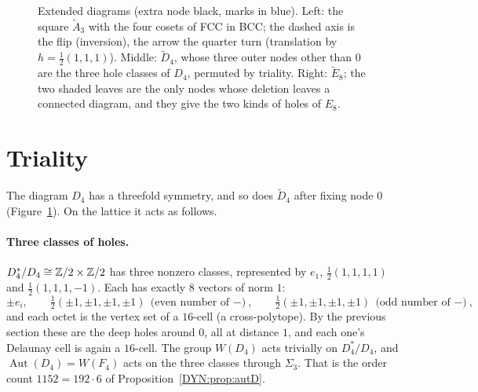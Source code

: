 \begin{figure}[ht]
\caption{Extended diagrams (extra node black, marks in blue). Left: the square $\tilde A_3$ with the four
cosets of FCC in BCC; the dashed axis is the flip (inversion), the arrow the quarter turn (translation by
$h=\frac12(1,1,1)$). Middle: $\tilde D_4$, whose three outer nodes other than $0$ are the three hole
classes of $D_4$, permuted by triality. Right: $\tilde E_8$; the two shaded leaves are the only nodes whose
deletion leaves a connected diagram, and they give the two kinds of holes of $E_8$.}
\label{DYN:fig:ext}
\end{figure}

\section{Triality}
\label{DYN:sec:triality}

The diagram $D_4$ has a threefold symmetry, and so does $\tilde D_4$ after fixing node $0$
(Figure~\ref{DYN:fig:ext}). On the lattice it acts as follows.

\paragraph{Three classes of holes.} $D_4^*/D_4\cong\mathbb{Z}/2\times\mathbb{Z}/2$ has three nonzero classes, represented
by $e_1$, $\frac12(1,1,1,1)$ and $\frac12(1,1,1,-1)$. Each has exactly $8$ vectors of norm $1$:
\[
  \pm e_i,\qquad \tfrac12(\pm1,\pm1,\pm1,\pm1)\ \text{(even number of $-$)},\qquad
  \tfrac12(\pm1,\pm1,\pm1,\pm1)\ \text{(odd number of $-$)},
\]
and each octet is the vertex set of a $16$-cell (a cross-polytope). By the previous section these are
the deep holes around $0$, all at distance $1$, and each one's Delaunay cell is again a $16$-cell. The
group $W(D_4)$ acts trivially on $D_4^*/D_4$, and $\operatorname{Aut}(D_4)=W(F_4)$ acts on the three classes through
$\Sigma_3$. That is the order count $1152=192\cdot6$ of Proposition~\ref{DYN:prop:autD}.


